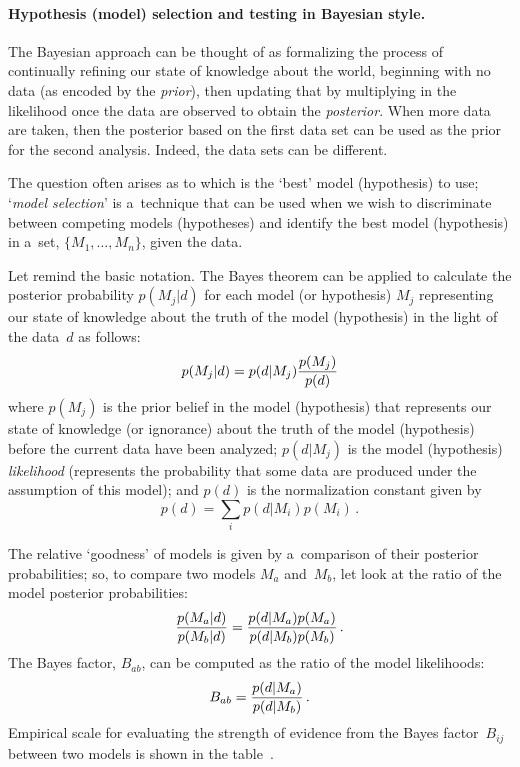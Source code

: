 \begin{multicols}{2}
\vspace*{-6pt}

  \paragraph*{Hypothesis (model) selection and testing in Bayesian style.} The
Bayesian approach can be thought of as formalizing the process of continually
refining our state of knowledge about the world, beginning with no data (as encoded
by the \textit{prior}), then updating that by multiplying in the likelihood once the
data  are observed to obtain the \textit{posterior}. When more data are taken, then the
posterior based on the first data set can be used as the prior for the second analysis.
Indeed, the data sets can be different.

  The question often arises as to which is the `best' model (hypothesis) to use;
`\textit{model selection}' is a~technique that can be used when we wish to
discriminate between competing models (hypotheses) and identify the best model
(hypothesis) in a~set, $\{M_1,\ldots , M_n\}$, given the data.

  Let remind the basic notation. The Bayes theorem can be applied to
calculate the posterior probability $p(M_j\vert d)$ for each model (or hypothesis) $M_j$
representing our state of knowledge about  the truth of the model (hypothesis) in the
light of the data~$d$ as follows:
  $$
  p(M_j\vert d) = p(d\vert M_j) \displaystyle\frac{\displaystyle p(M_j)\mathstrut}{\displaystyle p(d)\mathstrut}
  $$
  where $p(M_j)$ is the prior belief in the model (hypothesis) that represents our
state of knowledge (or ignorance) about the truth of the model (hypothesis) before
the  current data have been analyzed; $p(d\vert M_j)$ is the model
 (hypothesis)
\textit{likelihood} (represents the probability that some data are produced under the
assumption of this model);  and $p(d)$ is the normalization constant given by
  $$
  p(d) = \sum\limits_i p(d\vert M_i) p(M_i)\,.
  $$

  The relative `goodness' of models is given by a~comparison of their posterior
probabilities; so, to compare two models $M_a$ and~$M_b$, let look at the ratio of the
model posterior probabilities:
  $$
  \displaystyle\frac{\displaystyle p(M_a\vert d)\mathstrut}{\displaystyle p(M_b\vert d)\mathstrut} = \displaystyle\frac{\displaystyle  p(d\vert M_a)p(M_a)\mathstrut}{\displaystyle p(d\vert M_b)p(M_b)\mathstrut}\,.
  $$
  The Bayes factor, $B_{ab}$, can be computed as the ratio of the model likelihoods:
  $$
  B_{ab} = \displaystyle\frac{\displaystyle p(d\vert M_a)\mathstrut}{\displaystyle p(d\vert M_b)\mathstrut}\,.
  $$
  Empirical scale for evaluating the strength of evidence from the Bayes
factor~$B_{ij}$ between two models is shown in the table~\cite{32-kl}.


\end{multicols}
